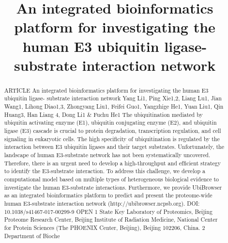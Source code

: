 \title{An integrated bioinformatics platform for investigating the human E3 ubiquitin ligase-substrate interaction network}

\maketitle

\begin{abstract}
ARTICLE An integrated bioinformatics platform for investigating the human E3 ubiquitin ligase- substrate interaction network Yang Li1, Ping Xie1,2, Liang Lu1, Jian Wang1, Lihong Diao1,3, Zhongyang Liu1, Feifei Guo1, Yangzhige He1, Yuan Liu1, Qin Huang3, Han Liang 4, Dong Li1 \& Fuchu He1 The ubiquitination mediated by ubiquitin activating enzyme (E1), ubiquitin conjugating enzyme (E2), and ubiquitin ligase (E3) cascade is crucial to protein degradation, transcription regulation, and cell signaling in eukaryotic cells. The high speciﬁcity of ubiquitination is regulated by the interaction between E3 ubiquitin ligases and their target substrates. Unfortunately, the landscape of human E3-substrate network has not been systematically uncovered. Therefore, there is an urgent need to develop a high-throughput and efﬁcient strategy to identify the E3-substrate interaction. To address this challenge, we develop a computational model based on multiple types of heterogeneous biological evidence to investigate the human E3-substrate interactions. Furthermore, we provide UbiBrowser as an integrated bioinformatics platform to predict and present the proteome-wide human E3-substrate interaction network (http://ubibrowser.ncpsb.org). DOI: 10.1038/s41467-017-00299-9 OPEN 1 State Key Laboratory of Proteomics, Beijing Proteome Research Center, Beijing Institute of Radiation Medicine, National Center for Protein Sciences (The PHOENIX Center, Beijing), Beijing 102206, China. 2 Department of Bioche
\end{abstract}

